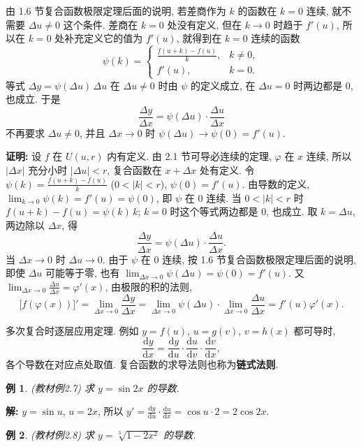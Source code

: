 \documentclass[UTF8,openany]{ctexbook}
\theoremstyle{chinesetextbook}
\newtheorem{example}{例}[section]
\newenvironment{cnproof}{\par\indent\textbf{证明:} \ignorespaces}{\par}
\newenvironment{cnsolution}{\par\indent\textbf{解:} \ignorespaces}{\par}
\newcommand{\dd}{\mathrm d}
\begin{document}
由 1.6 节复合函数极限定理后面的说明, 若差商作为 $k$ 的函数在 $k=0$ 连续, 就不需要 $\Delta u\ne0$ 这个条件. 差商在 $k=0$ 处没有定义, 但在 $k\to0$ 时趋于 $f'(u)$, 所以在 $k=0$ 处补充定义它的值为 $f'(u)$, 就得到在 $k=0$ 连续的函数
\[
\psi(k)=\begin{cases}\frac{f(u+k)-f(u)}k,&k\ne0,\\f'(u),&k=0.\end{cases}
\]
等式 $\Delta y=\psi(\Delta u)\,\Delta u$ 在 $\Delta u\ne0$ 时由 $\psi$ 的定义成立, 在 $\Delta u=0$ 时两边都是 $0$, 也成立. 于是
\[
\frac{\Delta y}{\Delta x}=\psi(\Delta u)\cdot\frac{\Delta u}{\Delta x}
\]
不再要求 $\Delta u\ne0$, 并且 $\Delta x\to0$ 时 $\psi(\Delta u)\to\psi(0)=f'(u)$.
\begin{cnproof}
设 $f$ 在 $U(u,r)$ 内有定义. 由 2.1 节可导必连续的定理, $\varphi$ 在 $x$ 连续, 所以 $|\Delta x|$ 充分小时 $|\Delta u|<r$, 复合函数在 $x+\Delta x$ 处有定义. 令 $\displaystyle\psi(k)=\frac{f(u+k)-f(u)}k$ ($0<|k|<r$), $\psi(0)=f'(u)$. 由导数的定义, $\displaystyle\lim_{k\to0}\psi(k)=f'(u)=\psi(0)$, 即 $\psi$ 在 $0$ 连续. 当 $0<|k|<r$ 时 $f(u+k)-f(u)=\psi(k)\,k$; $k=0$ 时这个等式两边都是 $0$, 也成立. 取 $k=\Delta u$, 两边除以 $\Delta x$, 得
\[
\frac{\Delta y}{\Delta x}=\psi(\Delta u)\cdot\frac{\Delta u}{\Delta x}.
\]
当 $\Delta x\to0$ 时 $\Delta u\to0$. 由于 $\psi$ 在 $0$ 连续, 按 1.6 节复合函数极限定理后面的说明, 即使 $\Delta u$ 可能等于零, 也有 $\displaystyle\lim_{\Delta x\to0}\psi(\Delta u)=\psi(0)=f'(u)$. 又 $\displaystyle\lim_{\Delta x\to0}\frac{\Delta u}{\Delta x}=\varphi'(x)$, 由极限的积的法则,
\[
\bigl[f(\varphi(x))\bigr]'=\lim_{\Delta x\to0}\frac{\Delta y}{\Delta x}=\lim_{\Delta x\to0}\psi(\Delta u)\cdot\lim_{\Delta x\to0}\frac{\Delta u}{\Delta x}=f'(u)\varphi'(x).
\]
\end{cnproof}
多次复合时逐层应用定理. 例如 $y=f(u)$, $u=g(v)$, $v=h(x)$ 都可导时,
\[
\frac{\dd y}{\dd x}=\frac{\dd y}{\dd u}\cdot\frac{\dd u}{\dd v}\cdot\frac{\dd v}{\dd x},
\]
各个导数在对应点处取值. 复合函数的求导法则也称为\textbf{链式法则}.
\begin{example}\label{ex:c2-2-7}
\textnormal{(教材例2.7)} 求 $y=\sin2x$ 的导数.
\end{example}
\begin{cnsolution}
$y=\sin u$, $u=2x$, 所以 $\displaystyle y'=\frac{\dd y}{\dd u}\cdot\frac{\dd u}{\dd x}=\cos u\cdot2=2\cos2x$.
\end{cnsolution}
\begin{example}\label{ex:c2-2-8}
\textnormal{(教材例2.8)} 求 $y=\sqrt[3]{1-2x^2}$ 的导数.
\end{example}
\end{document}
